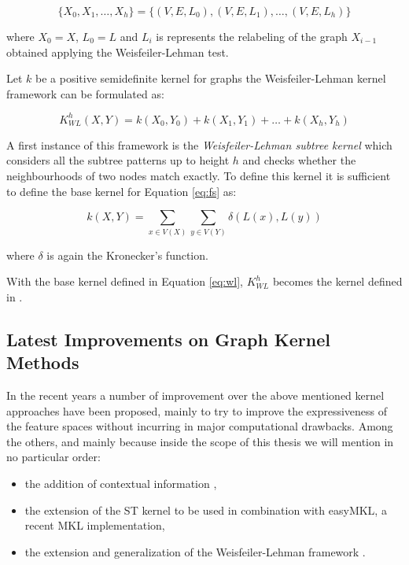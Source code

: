 \[\{X_0,X_1,\dots,X_h\} = \{(V,E,L_0),(V,E,L_1),\dots,(V,E,L_h)\}\]

where $X_0 = X$, $L_0 = L$ and $L_i$ is represents the relabeling of the graph
$X_{i-1}$ obtained applying the Weisfeiler-Lehman test.

Let $k$ be a positive semidefinite kernel for graphs the Weisfeiler-Lehman kernel
framework can be formulated as:

\begin{equation}
    K_{WL}^h(X,Y) = k(X_0,Y_0) + k(X_1,Y_1) + \dots + k(X_h,Y_h)
    \label{eq:fs}
\end{equation}

A first instance of this framework is the \emph{Weisfeiler-Lehman subtree kernel}
which considers all the subtree patterns up to height $h$ and checks whether the
neighbourhoods of two nodes match exactly.
To define this kernel it is sufficient to define the base kernel for Equation
\ref{eq:fs} as:

\begin{equation}
    k(X,Y) = \sum_{x \in V(X)}\sum_{y \in V(Y)} \delta(L(x),L(y))
    \label{eq:wl}
\end{equation}

where $\delta$ is again the Kronecker's function.

With the base kernel defined in Equation \ref{eq:wl}, $K_{WL}^h$ becomes the
kernel defined in \cite{NIPS2009_3813}.

\subsection{Latest Improvements on Graph Kernel Methods}
\label{subsec:kernel}
In the recent years a number of improvement over the above mentioned kernel approaches
have been proposed, mainly to try to improve the expressiveness of the feature
spaces without incurring in major computational drawbacks.
Among the others, and mainly because inside the scope of this thesis we will
mention in no particular order:
\begin{itemize}
    \item the addition of contextual information \cite{Navarin2015},
    \item the extension of the ST kernel to be used in combination with easyMKL,
        a recent MKL implementation,
    \item the extension and generalization of the Weisfeiler-Lehman framework \cite{SanMartino2014}.
\end{itemize}

